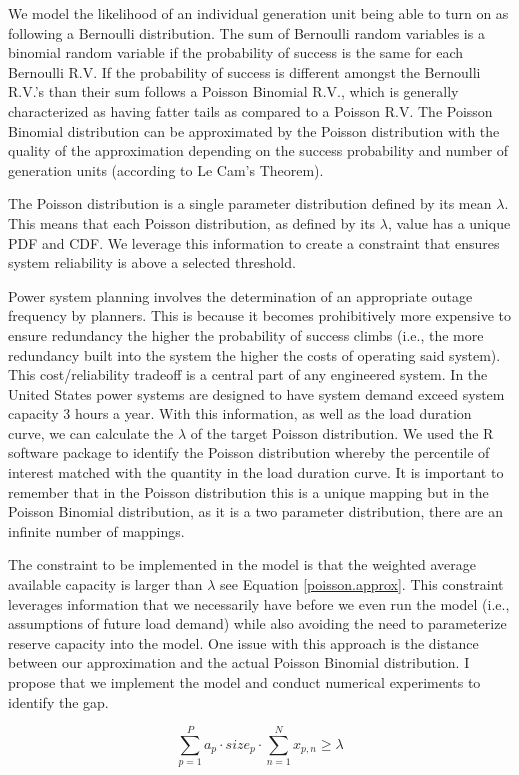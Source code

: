 \documentclass[10pt]{amsart}
\begin{document}
We model the likelihood of an individual generation unit being able to turn on as following a Bernoulli distribution.
The sum of Bernoulli random variables is a binomial random variable if the probability of success is the same for each Bernoulli R.V.  
If the probability of success is different amongst the Bernoulli R.V.'s than their sum follows a Poisson Binomial R.V., which is generally characterized as having fatter tails as compared to a Poisson R.V.
The Poisson Binomial distribution can be approximated by the Poisson distribution  with the quality of the approximation depending on the success probability and number of generation units (according to Le Cam's Theorem).

The Poisson distribution is a single parameter distribution defined by its mean $\lambda$. 
This means that each Poisson distribution, as defined by its $\lambda$, value has a unique PDF and CDF. 
We leverage this information to create a constraint that ensures system reliability is above a selected threshold. 

Power system planning involves the determination of an appropriate outage frequency by planners.
This is because it becomes prohibitively more expensive to ensure redundancy the higher the probability of success climbs (i.e., the more redundancy built into the system the higher the costs of operating said system).
This cost/reliability tradeoff is a central part of any engineered system.
In the United States power systems are designed to have system demand exceed system capacity 3 hours a year.
With this information, as well as the load duration curve, we can calculate the $\lambda$ of the target Poisson distribution.
We used the R software package to identify the Poisson distribution whereby the percentile of interest matched with the quantity in the load duration curve.
It is important to remember that in the Poisson distribution this is a unique mapping but in the Poisson Binomial distribution, as it is a two parameter distribution, there are an infinite number of mappings.

The constraint to be implemented in the model is that the weighted average available capacity is larger than $\lambda$ see Equation \ref{poisson.approx}.
This constraint leverages information that we necessarily have before we even run the model (i.e., assumptions of future load demand) while also avoiding the need to parameterize reserve capacity into the model. 
One issue with this approach is the distance between our approximation and the actual Poisson Binomial distribution.
I propose that we implement the model and conduct numerical experiments to identify the gap.

\begin{equation}\label{poisson.approx}
\sum_{p=1}^{P} a_{p} \cdot size_{p} \cdot \sum_{n=1}^{N} x_{p,n} \geq \lambda
\end{equation}
\end{document}
